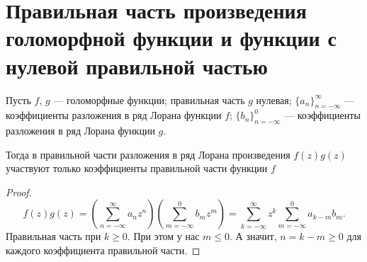 \section{Правильная часть произведения голоморфной функции и функции с нулевой правильной частью}
\begin{Th*}
Пусть $f$, $g$ --- голоморфные функции; правильная часть $g$ нулевая; 
$\{a_n\}_{n=-\infty}^\infty$ --- коэффициенты разложения в ряд Лорана функции $f$;
$\{b_n\}_{n=-\infty}^{0}$ --- коэффициенты разложения в ряд Лорана функции $g$.

Тогда в правильной части разложения в ряд Лорана произведения $f(z)g(z)$ участвуют только коэффициенты правильной части функции $f$
\end{Th*}
\begin{proof}
\[
    f(z)g(z) =
%
    \left(\sum_{n=-\infty}^{\infty} a_n z^n\right)
    \left(\sum_{m=-\infty}^{0} b_m z^m\right) =
%
    \sum_{k=-\infty}^{\infty} z^k \sum_{m=-\infty}^{0} a_{k-m} b_m
.\]
Правильная часть при $k \ge 0$. При этом у нас $m \le 0$. А значит, $n = k-m \ge 0$ для каждого коэффициента правильной части.
\end{proof}
